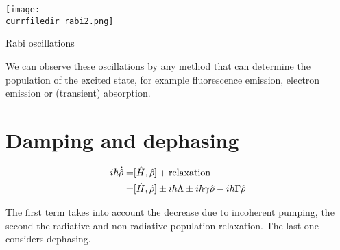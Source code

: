 \begin{marginfigure} 
    \centering
    \texttt{[image: \\currfiledir rabi2.png]}
    \caption{Rabi oscillations}
    \label{fig:Rabi}
\end{marginfigure}

We can observe these oscillations by any method that can determine the population of the excited state, for example fluorescence emission, electron emission or (transient) absorption.




\section{Damping and dephasing}


\begin{align*}
    i\hbar \dot{\hat{\rho}} =& [\hat{H},\hat{\rho}] + \text{relaxation}
     \notag\\
    =& [\hat{H},\hat{\rho}] \pm i\hbar\Lambda \pm i\hbar\gamma \hat{\rho} - i\hbar \Gamma \hat{\rho}
\end{align*}


The first term takes into account the decrease due to incoherent pumping, the second the radiative and non-radiative population relaxation. The last one considers dephasing. 





\printbibliography[segment=\therefsegment,heading=subbibliography]
